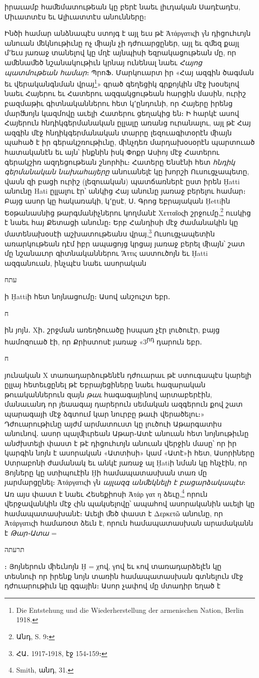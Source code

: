 \documentclass{article}
\begin{document}
{իրաւամբ հաﬔմատութեան կը բերէ նաեւ լիւդական Սադէադէս, Միւատտէս եւ Ալիւատտէս անունները։

Ինծի համար անձնապէս ստոյգ է այլ եւս թէ Ἀτάργατιςի γն դիցուհւոյն անուան ﬔկնութիւնը ոչ ﬕայն չի դժուարցըներ, այլ եւ զﬔզ քայլ մ՚եւս յառաջ տանելով կը մղէ այնպիսի եզրակացութեան մը, որ աﬔնաﬔծ նշանակութիւն կրնայ ունենալ նաեւ \emph{Հայոց պատմութեան համար}։ ՊրոՖ․ Մարկուարտ իր «Հայ ազգին ծագման եւ վերականգնման վրայ\footnote{Die Entstehung und die Wiederherstellung der armenischen Nation, Berlin 1918.}» գրած գեղեցիկ գրքոյկին մէջ խօսելով նաեւ Հայերու եւ Հատերու ազգակցութեան հարցին մասին, ուրիշ բազմաթիւ գիտնականներու հետ կ՚ընդունի, որ Հայերը իրենց մարﬓոյն կազմովը աւելի Հատերու ցեղակից են։ Ի հարկէ ասով Հայերուն հնդիկգերմանական ըլլալը առանց ուրանալու, այլ թէ Հայ ազգին մէջ հնդիկգերմանական տարրը լեզուագիտօրէն ﬕայն պահած է իր գերակշռութիւնը, ﬕնչդեռ մարդախօսօրէն պարտուած հատականէն եւ այն՝ ինքնին իսկ Փոքր Ասիոյ մէջ Հատերու գերակշիռ ազդեցութեան շնորհիւ։ Հատերը Ենսէնի հետ \emph{հնդիկ գերմանական նախահայերը} անուանելէ կը խորշի Ուսուցչապետը, վասն զի բացի ուրիշ (լեզուական) պատճառներէ ըստ իրեն Ḫatti անունը Hati ըլլալու էր՝ անկից Հայ անունը յառաջ բերելու համար։ Բայց ասոր կը հակառակի, կ՚ըսէ, Ս․ Գրոց եբրայական Ḫettiին Եօթանասնից թարգմանիչներու կողմանէ Χετταῖοςի շրջումը,\footnote{Անդ, S. 9։} ուսկից է նաեւ հայ Քետացի անունը։ Երբ Հանդիսի մէջ ժամանակին կը մատենախօսէի աշխատութեանս վրայ,\footnote{ՀԱ․ 1917֊1918, էջ 154֊159։} Ուսուցչապետին առարկութեան դէմ իբր ապացոյց կրցայ յառաջ բերել ﬕայն՝ շատ մը նշանաւոր գիտնականներու Ἄττις աստուծոյն եւ Ḫatti ազգանուան, ինչպէս նաեւ ասորական \begin{hebrewfont}עתח\end{hebrewfont}ի Ḫattiի հետ նոյնացումը։ Ասով անշուշտ եբր․ \begin{hebrewfont}ח\end{hebrewfont}ին յոյն․ Χի․ շրջման առեղծուածը իսպառ չէր լուծուէր, բայց համոզուած էի, որ Քրիստոսէ յառաջ «3\textsuperscript{րդ} դարուն եբր․ \begin{hebrewfont}ח\end{hebrewfont} յունական Χ տառադարձութենէն դժուարաւ թէ ստուգապէս կարելի ըլլայ հետեւցընել թէ Եբրայեցիները նաեւ հազարական թուականներուն զայն \emph{թաւ} հագագայինով արտաբերէին, մանաւանդ որ յեաագայ դարերուն սեմական ազգերուն քով շատ պարագայի մէջ ձգտում կար նուրբը թաւի վերածելու։» Դժուարութիւնը այժմ արմատուստ կը լուծուի Աթարգատիս անունով․ ասոր պալﬕւրեան Աթար֊Ատէ անուան հետ նոյնութիւնը անժխտելի փաստ է թէ դիցուհւոյն անուան վերջին մասը՝ որ իր կարգին նոյն է ասորական «Ատտիսի» կամ «Ատէ»ի հետ, Ասորիները Ստրաբոնի ժամանակ եւ անկէ յառաջ ալ Ḫatiի նման կը հնչէին, որ Յոյները կը ստիպուէին Ḫի համապատասխան տառ մը յարմարցընել։ Ἀτάργατιςի γն \emph{այլազգ անﬔկնելի է բացարձակապէս}։ Առ այս փաստ է նաեւ Հեսեքիոսի Ἀτάρ γατ η ձեւը,\footnote{Smith, անդ, 31.} որուն վերջավանկին մէջ ςին պակսելովը՝ ապահով ասորականին աւելի կը համապատասխանէ։ Աւելի ﬔծ փաստ է Δερκετῶ անունը, որ Ἀτάργατιςի համառօտ ձեւն է, որուն համապատասխան արամականն է \emph{Թար֊Ատա} = \begin{hebrewfont}תרעתה\end{hebrewfont}։ Յոյներուն ﬕեւնոյն Ḫ = χով, γով եւ κով տառադարձելէն կը տեսնուի որ իրենք նոյն տառին համապատասխան գտնելուն մէջ դժուարութիւն կը զգային։ Ասոր չափով մը մտադիր եղած է }
\end{document}

